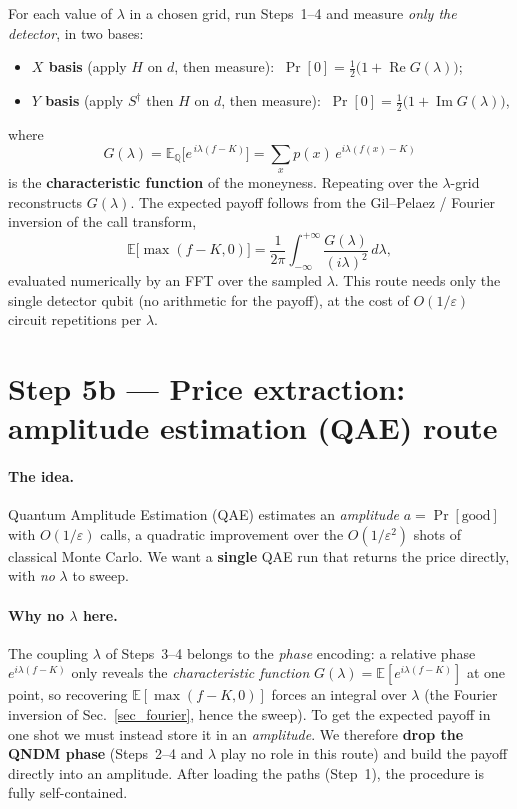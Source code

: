 \documentclass{article}
\begin{document}
For each value of $\lambda$ in a chosen grid, run Steps~1--4 and measure \emph{only the detector}, in two bases:
\begin{itemize}
    \item \textbf{$X$ basis} (apply $H$ on $d$, then measure): $\ \Pr[0] = \tfrac12\big(1+\operatorname{Re}G(\lambda)\big)$;
    \item \textbf{$Y$ basis} (apply $S^\dagger$ then $H$ on $d$, then measure): $\ \Pr[0] = \tfrac12\big(1+\operatorname{Im}G(\lambda)\big)$,
\end{itemize}
where
\begin{equation}
G(\lambda) = \mathbb{E}_{\mathbb{Q}}\!\big[e^{\,i\lambda(f-K)}\big] = \sum_x p(x)\,e^{i\lambda(f(x)-K)}
\end{equation}
is the \textbf{characteristic function} of the moneyness. Repeating over the $\lambda$-grid reconstructs $G(\lambda)$. The expected payoff follows from the Gil--Pelaez / Fourier inversion of the call transform,
\begin{equation}
\mathbb{E}\big[\max(f-K,0)\big] = \frac{1}{2\pi}\int_{-\infty}^{+\infty} \frac{G(\lambda)}{(i\lambda)^2}\,d\lambda,
\end{equation}
evaluated numerically by an FFT over the sampled $\lambda$. This route needs only the single detector qubit (no arithmetic for the payoff), at the cost of $O(1/\varepsilon)$ circuit repetitions per $\lambda$.


\section{Step 5b --- Price extraction: amplitude estimation (QAE) route}\label{sec_qae}

\paragraph{The idea.} Quantum Amplitude Estimation (QAE) estimates an \emph{amplitude} $a=\Pr[\text{good}]$ with $O(1/\varepsilon)$ calls, a quadratic improvement over the $O(1/\varepsilon^2)$ shots of classical Monte Carlo. We want a \textbf{single} QAE run that returns the price directly, with \emph{no} $\lambda$ to sweep.

\paragraph{Why no $\lambda$ here.} The coupling $\lambda$ of Steps~3--4 belongs to the \emph{phase} encoding: a relative phase $e^{i\lambda(f-K)}$ only reveals the \emph{characteristic function} $G(\lambda)=\mathbb{E}[e^{i\lambda(f-K)}]$ at one point, so recovering $\mathbb{E}[\max(f-K,0)]$ forces an integral over $\lambda$ (the Fourier inversion of Sec.~\ref{sec_fourier}, hence the sweep). To get the expected payoff in one shot we must instead store it in an \emph{amplitude}. We therefore \textbf{drop the QNDM phase} (Steps~2--4 and $\lambda$ play no role in this route) and build the payoff directly into an amplitude. After loading the paths (Step~1), the procedure is fully self-contained.
\end{document}
